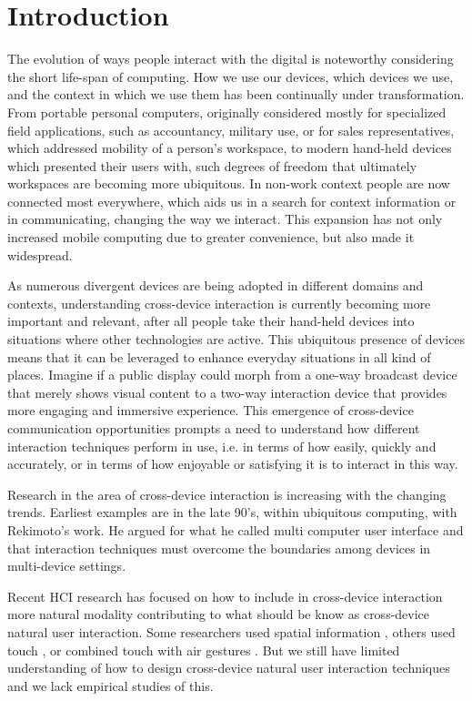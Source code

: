 \section{Introduction} \label{sec:introduction}
The evolution of ways people interact with the digital is noteworthy considering the short life-span of computing. How we use our devices, which devices we use, and the context in which we use them has been continually under transformation. From portable personal computers, originally considered mostly for specialized field applications, such as accountancy, military use, or for sales representatives, which addressed mobility of a person's workspace, to modern hand-held devices which presented their users with, such degrees of freedom that ultimately workspaces are becoming more ubiquitous. In non-work context people are now connected most everywhere, which aids us in a search for context information or in communicating, changing the way we interact. This expansion has not only increased mobile computing due to greater convenience, but also made it widespread.\cite{Francis:1997} 

As numerous divergent devices are being adopted in different domains and contexts, understanding cross-device interaction is currently becoming more important and relevant, after all people take their hand-held devices into situations where other technologies are active. This ubiquitous presence of devices means that it can be leveraged to enhance everyday situations in all kind of places. Imagine if a public display could morph from a one-way broadcast device that merely shows visual content to a two-way interaction device that provides more engaging and immersive experience. This emergence of cross-device communication opportunities prompts a need to understand how different interaction techniques perform in use, i.e. in terms of how easily, quickly and accurately, or in terms of how enjoyable or satisfying it is to interact in this way.

Research in the area of cross-device interaction is increasing with the changing trends. Earliest examples are in the late 90's, within ubiquitous computing, with Rekimoto's work.  He argued for what he called multi computer user interface and that interaction techniques must overcome the boundaries among devices in multi-device settings\cite{Rekimoto:1998}.

Recent HCI research has focused on how to include in cross-device interaction more natural modality contributing to what should be know as cross-device natural user interaction.  Some researchers used spatial information \cite{Marquardt:2011, Marquardt:2012}, others used touch \cite{Seifert:2012}, or combined touch with air gestures \cite{Bragdon:2011} . But we still have limited understanding of how to design cross-device natural user interaction techniques and we lack empirical studies of this.

